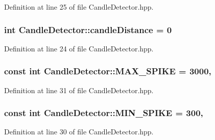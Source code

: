 Definition at line 25 of file Candle\-Detector.\-hpp.

\hypertarget{classCandleDetector_a3d4f2c951c77838bfc5c068b58cf9fda}{
\subsubsection[{candle\-Distance}]{\setlength{\rightskip}{0pt plus 5cm}int Candle\-Detector\-::candle\-Distance = 0\hspace{0.3cm}{\ttfamily [private]}}}\label{classCandleDetector_a3d4f2c951c77838bfc5c068b58cf9fda}


Definition at line 24 of file Candle\-Detector.\-hpp.

\hypertarget{classCandleDetector_a3903cd4085162f1fc38ca74cac3b954e}{
\subsubsection[{M\-A\-X\-\_\-\-S\-P\-I\-K\-E}]{\setlength{\rightskip}{0pt plus 5cm}const int Candle\-Detector\-::\-M\-A\-X\-\_\-\-S\-P\-I\-K\-E = 3000\hspace{0.3cm}{\ttfamily [static]}, {\ttfamily [private]}}}\label{classCandleDetector_a3903cd4085162f1fc38ca74cac3b954e}


Definition at line 31 of file Candle\-Detector.\-hpp.

\hypertarget{classCandleDetector_a9062a3c45b98c5d051082dbf4a285fd5}{
\subsubsection[{M\-I\-N\-\_\-\-S\-P\-I\-K\-E}]{\setlength{\rightskip}{0pt plus 5cm}const int Candle\-Detector\-::\-M\-I\-N\-\_\-\-S\-P\-I\-K\-E = 300\hspace{0.3cm}{\ttfamily [static]}, {\ttfamily [private]}}}\label{classCandleDetector_a9062a3c45b98c5d051082dbf4a285fd5}


Definition at line 30 of file Candle\-Detector.\-hpp.

